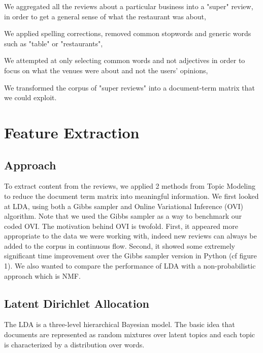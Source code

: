 \documentclass[twoside]{article}
\begin{document}
\begin{multicols}{2}
\begin{compactitem}
	\item We aggregated all the reviews about a particular business into a "super" review, in order to get a general sense of what the restaurant was about,
	\item We applied spelling corrections, removed common stopwords and generic words such as "table" or "restaurants",
	\item We attempted at only selecting common words and not adjectives in order to focus on what the venues were about and not the users' opinions,
	\item We transformed the corpus of "super reviews" into a document-term matrix that we could exploit.
\end{compactitem}


\section{Feature Extraction}

\subsection{Approach}

To extract content from the reviews, we applied 2  methods from Topic Modeling to reduce the document term matrix into meaningful information. We first looked at LDA, using both a Gibbs sampler and Online Variational Inference (OVI) algorithm. Note that we used the Gibbs sampler as a way to benchmark our coded OVI. The motivation behind OVI is twofold. First, it appeared more appropriate to the data we were working with, indeed new reviews can always be added to the corpus in continuous flow. Second, it showed some extremely significant time improvement over the Gibbs sampler version in Python (cf figure 1). We also wanted to compare the performance of LDA with a non-probabilistic approach which is NMF. 
  
\subsection{Latent Dirichlet Allocation}

The LDA is a three-level hierarchical Bayesian model. The basic idea that documents are represented as random mixtures over latent topics and each topic is characterized by a distribution over words.\cite{LDA}\\


\end{multicols}
\end{document}
